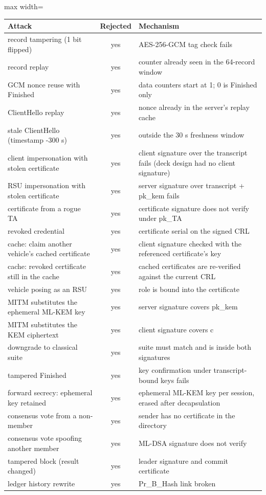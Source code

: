 \begin{adjustbox}{max width=\linewidth}
\begin{tabular}{p{5.4cm}cp{7.2cm}}
\toprule
Attack & Rejected & Mechanism \\
\midrule
record tampering (1 bit flipped) & yes & AES-256-GCM tag check fails \\
record replay & yes & counter already seen in the 64-record window \\
GCM nonce reuse with Finished & yes & data counters start at 1; 0 is Finished only \\
ClientHello replay & yes & nonce already in the server's replay cache \\
stale ClientHello (timestamp -300 s) & yes & outside the 30 s freshness window \\
client impersonation with stolen certificate & yes & client signature over the transcript fails (deck design had no client signature) \\
RSU impersonation with stolen certificate & yes & server signature over transcript + pk\_kem fails \\
certificate from a rogue TA & yes & certificate signature does not verify under pk\_TA \\
revoked credential & yes & certificate serial on the signed CRL \\
cache: claim another vehicle's cached certificate & yes & client signature checked with the referenced certificate's key \\
cache: revoked certificate still in the cache & yes & cached certificates are re-verified against the current CRL \\
vehicle posing as an RSU & yes & role is bound into the certificate \\
MITM substitutes the ephemeral ML-KEM key & yes & server signature covers pk\_kem \\
MITM substitutes the KEM ciphertext & yes & client signature covers c \\
downgrade to classical suite & yes & suite must match and is inside both signatures \\
tampered Finished & yes & key confirmation under transcript-bound keys fails \\
forward secrecy: ephemeral key retained & yes & ephemeral ML-KEM key per session, erased after decapsulation \\
consensus vote from a non-member & yes & sender has no certificate in the directory \\
consensus vote spoofing another member & yes & ML-DSA signature does not verify \\
tampered block (result changed) & yes & leader signature and commit certificate \\
ledger history rewrite & yes & Pr\_B\_Hash link broken \\
\bottomrule
\end{tabular}
\end{adjustbox}
